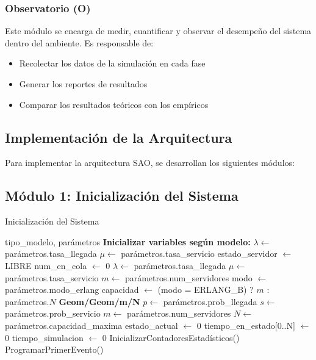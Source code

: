 \documentclass{article}
\begin{document}
\subsubsection{Observatorio (O)}

Este módulo se encarga de medir, cuantificar y observar el desempeño del sistema dentro del ambiente. Es responsable de:

\begin{itemize}
    \item Recolectar los datos de la simulación en cada fase
    \item Generar los reportes de resultados
    \item Comparar los resultados teóricos con los empíricos
\end{itemize}

\subsection{Implementación de la Arquitectura}

Para implementar la arquitectura SAO, se desarrollan los siguientes módulos:

\subsection{Módulo 1: Inicialización del Sistema}
\begin{algorithm}[H]
\caption{Inicialización del Sistema}
\begin{algorithmic}[1]
\REQUIRE tipo\_modelo, parámetros
\STATE \textbf{Inicializar variables según modelo:}
    \STATE $\lambda \gets$ parámetros.tasa\_llegada
    \STATE $\mu \gets$ parámetros.tasa\_servicio
    \STATE estado\_servidor $\gets$ LIBRE
    \STATE num\_en\_cola $\gets$ 0
    \STATE $\lambda \gets$ parámetros.tasa\_llegada
    \STATE $\mu \gets$ parámetros.tasa\_servicio
    \STATE $m \gets$ parámetros.num\_servidores
    \STATE modo $\gets$ parámetros.modo\_erlang 
    \STATE capacidad $\gets$ (modo = ERLANG\_B) ? $m$ : parámetros.$N$
\ELSE
    \STATE \textbf{Geom/Geom/m/N}
    \STATE $p \gets$ parámetros.prob\_llegada
    \STATE $s \gets$ parámetros.prob\_servicio
    \STATE $m \gets$ parámetros.num\_servidores
    \STATE $N \gets$ parámetros.capacidad\_maxima
    \STATE estado\_actual $\gets$ 0
    \STATE tiempo\_en\_estado[0..N] $\gets$ 0
\ENDIF
\STATE tiempo\_simulacion $\gets$ 0
\STATE InicializarContadoresEstadísticos()
\STATE ProgramarPrimerEvento()
\end{algorithmic}
\end{algorithm}
\end{document}
